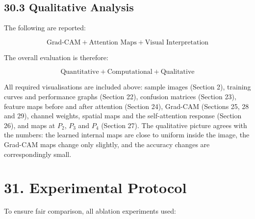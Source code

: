 \documentclass[10pt]{article}
\begin{document}
\subsection*{30.3 Qualitative Analysis}

The following are reported:

\[
\boxed{
\text{Grad-CAM}
+
\text{Attention Maps}
+
\text{Visual Interpretation}
}
\]

The overall evaluation is therefore:

\[
\boxed{
\text{Quantitative}
+
\text{Computational}
+
\text{Qualitative}
}
\]

All required visualisations are included above: sample images (Section 2),
training curves and performance graphs (Section 22), confusion matrices
(Section 23), feature maps before and after attention (Section 24), Grad-CAM
(Sections 25, 28 and 29), channel weights, spatial maps and the self-attention
response (Section 26), and maps at $P_2$, $P_3$ and $P_4$ (Section 27). The
qualitative picture agrees with the numbers: the learned internal maps are close
to uniform inside the image, the Grad-CAM maps change only slightly, and the
accuracy changes are correspondingly small.

\section*{31. Experimental Protocol}

To ensure fair comparison, all ablation experiments used:
\end{document}
